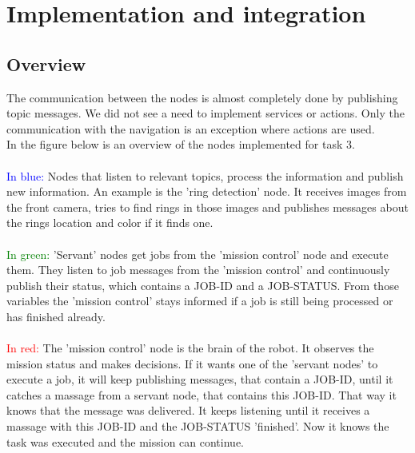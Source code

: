 \documentclass[a4paper,
  twoside, %
  headlines=2.1 %
  ]{scrartcl}
\begin{document}
\newpage

\section{Implementation and integration}

\subsection{Overview}
The communication between the nodes is almost completely done by publishing topic messages. We did not see a need to implement services or actions. Only the communication with the navigation is an exception where actions are used.\\
In the figure below is an overview of the nodes implemented for task 3.\\
\\
\textcolor{blue}{In blue:} Nodes that listen to relevant topics, process the information and publish new information. An example is the 'ring detection' node. It receives images from the front camera, tries to find rings in those images and publishes messages about the rings location and color if it finds one.\\
\\
\textcolor{green}{In green:} 'Servant' nodes get jobs from the 'mission control' node and execute them. They listen to job messages from the 'mission control' and continuously publish their status, which contains a JOB-ID and a JOB-STATUS. From those variables the 'mission control' stays informed if a job is still being processed or has finished already.\\
\\
\textcolor{red}{In red:} The 'mission control' node is the brain of the robot. It observes the mission status and makes decisions. If it wants one of the 'servant nodes' to execute a job, it will keep publishing messages, that contain a JOB-ID, until it catches a massage from a servant node, that contains this JOB-ID. That way it knows that the message was delivered. It keeps listening until it receives a massage with this JOB-ID and the JOB-STATUS 'finished'. Now it knows the task was executed and the mission can continue.

\newpage
\end{document}
